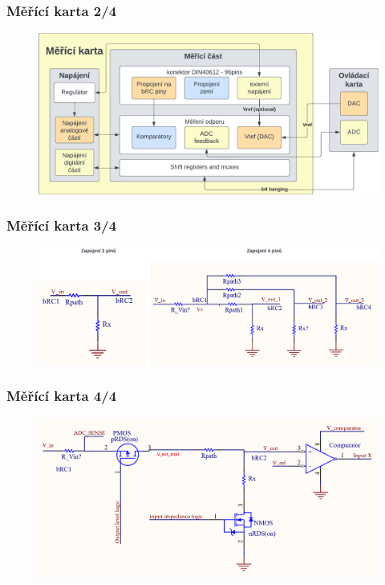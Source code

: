 \documentclass[%
  12pt,       				%
	t,                  %
	aspectratio=1610,   %
	unicode,						%
]{beamer}				    	%
\begin{document}
\begin{frame} 
	\frametitle{Měřící karta  2/4}
	\vspace*{0.5cm}
	\begin{figure}[ht!]
		\centering
		\includegraphics[width = \textwidth]{obrazky/karta_system_diagram.png}
	\end{figure}
\end{frame}


\begin{frame} 
	\frametitle{Měřící karta 3/4}
	\vspace*{0.5cm}
	\begin{figure}[ht!]
		\centering
		\includegraphics[width = \textwidth]{obrazky/2_and_4_pins_connection.png}
	\end{figure}
\end{frame}

\begin{frame} 
	\frametitle{Měřící karta 4/4}
	\vspace*{0.5cm}
	\begin{figure}[ht!]
		\centering
		\includegraphics[width = \textwidth]{obrazky/final_connection.png}
	\end{figure}
\end{frame}
\end{document}

